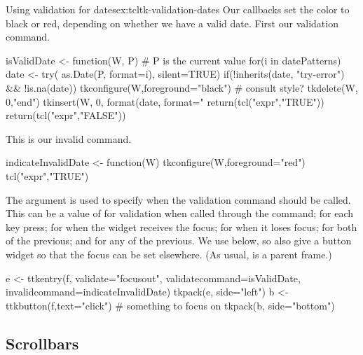 \begin{example}{Using validation for dates}{ex:tcltk-validation-dates}
Our callbacks set the color to black or red, depending on whether we
have a valid date. First our validation command.
\begin{Schunk}
\begin{Sinput}
 isValidDate <- function(W, P) { # P is the current value
   for(i in datePatterns) {
     date <- try( as.Date(P, format=i), silent=TRUE)
     if(!inherits(date, "try-error") && !is.na(date)) {
       tkconfigure(W,foreground="black") #  consult style?
       tkdelete(W, 0,"end")
       tkinsert(W, 0, format(date, format="%
       return(tcl("expr","TRUE"))        
     } 
   }
   return(tcl("expr","FALSE"))
 }
\end{Sinput}
\end{Schunk}

This is our invalid command.
\begin{Schunk}
\begin{Sinput}
 indicateInvalidDate <- function(W) {
   tkconfigure(W,foreground="red")
   tcl("expr","TRUE")
 }
\end{Sinput}
\end{Schunk}


The  argument is used to specify when the
validation command should be called. This can be a value of
 for validation when called through the 
command;  for each key press;  for when the
widget receives the focus;  for when it loses focus;
 for both of the previous; and  for any of the
previous. We use  below, so also give a button widget
so that the focus can be set elsewhere. (As usual,  is a
parent frame.)
\begin{Schunk}
\begin{Sinput}
 e <- ttkentry(f, validate="focusout",
               validatecommand=isValidDate,
               invalidcommand=indicateInvalidDate)
 tkpack(e, side="left")
 b <- ttkbutton(f,text="click")          # something to focus on
 tkpack(b, side="bottom")
\end{Sinput}
\end{Schunk}
              
\end{example}


\subsection{Scrollbars}
\label{sec:tcltk:scrollbars}

